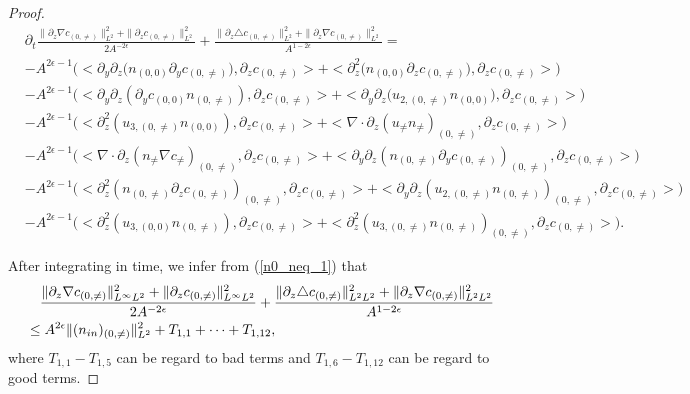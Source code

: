\documentclass[10pt,a4paper]{amsart}
\begin{document}
\begin{proof}
\begin{equation}
			\begin{aligned}
				&\partial_t\frac{\|\partial_z\nabla c_{(0,\neq)}\|^2_{L^2}
					+\|\partial_zc_{(0,\neq)}\|^2_{L^2}}{2A^{-2\epsilon}}
				+\frac{\|\partial_z\triangle c_{(0,\neq)}\|^2_{L^2}+
					\|\partial_z\nabla c_{(0,\neq)}\|^2_{L^2}}{A^{1-2\epsilon}}= \\
				&-A^{2\epsilon-1}\big(<\partial_y\partial_z\big(n_{(0,0)}\partial_{y}c_{(0,\neq)}),\partial_zc_{(0,\neq)}>
				+<\partial_z^2\big(n_{(0,0)}\partial_{z}c_{(0,\neq)}\big),\partial_zc_{(0,\neq)}>\big)\\
				&-A^{2\epsilon-1}\big(<\partial_y\partial_z(\partial_{y}c_{(0,0)}n_{(0,\neq)}),\partial_zc_{(0,\neq)}>
				+<\partial_y\partial_z\big(u_{2,(0,\neq)}n_{(0,0)}\big),\partial_zc_{(0,\neq)}>\big)\\	&-A^{2\epsilon-1}\big(<\partial_z^2(u_{3,(0,\neq)}n_{(0,0)}),
				\partial_zc_{(0,\neq)}>
				+<\nabla\cdot\partial_z(u_{\neq}n_{\neq})_{(0,\neq)},
				\partial_zc_{(0,\neq)}>\big)\\
				&-A^{2\epsilon-1}\big(<\nabla\cdot\partial_z(n_{\neq}\nabla c_{\neq})_{(0,\neq)},\partial_zc_{(0,\neq)}>
				+<\partial_y\partial_z(n_{(0,\neq)}
				\partial_{y}c_{(0,\neq)})_{(0,\neq)},
				\partial_zc_{(0,\neq)}>\big)\\
				&-A^{2\epsilon-1}\big(<\partial_z^2(n_{(0,\neq)}
				\partial_{z}c_{(0,\neq)})_{(0,\neq)},\partial_zc_{(0,\neq)}>
				+<\partial_y\partial_z(u_{2,(0,\neq)}n_{(0,\neq)})_{(0,\neq)},
				\partial_zc_{(0,\neq)}>\big)\\
				&-A^{2\epsilon-1}\big(<\partial_z^2(u_{3,(0,0)}n_{(0,\neq)}),
				\partial_zc_{(0,\neq)}>+
				<\partial_z^2(u_{3,(0,\neq)}n_{(0,\neq)})_{(0,\neq)},
				\partial_zc_{(0,\neq)}>\big).
			\end{aligned}
		\end{equation}
		
		After integrating in time, we infer from (\ref{n0_neq_1}) that  
		\begin{equation}\label{n0_neq_2}
			\begin{aligned}
				&\quad\frac{\|\partial_z\nabla c_{(0,\neq)}\|^2_{L^{\infty}L^2}
					+\|\partial_zc_{(0,\neq)}\|^2_{L^{\infty}L^2}}{2A^{-2\epsilon}}
				+\frac{\|\partial_z\triangle c_{(0,\neq)}\|^2_{L^2L^2}+
					\|\partial_z\nabla c_{(0,\neq)}\|^2_{L^{2}L^2}}{A^{1-2\epsilon}}\\
				&\leq A^{2\epsilon}\|(n_{\rm in})_{(0,\neq)}\|^2_{L^2}+T_{1,1}+\cdots+T_{1,12},
			\end{aligned}
		\end{equation}
		where $T_{1,1}-T_{1,5}$ can be regard to bad terms and 
		$T_{1,6}-T_{1,12}$ can be regard to good terms.
		

\end{proof}
\end{document}

